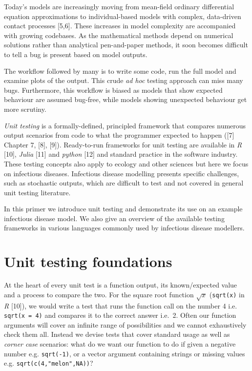\documentclass[10pt,letterpaper]{article}
\begin{document}
Today's models are increasingly moving from mean-field ordinary differential equation approximations to individual-based models with complex, data-driven contact processes {[}5,6{]}.
These increases in model complexity are accompanied with growing codebases.
As the mathematical methods depend on numerical solutions rather than analytical pen-and-paper methods, it soon becomes difficult to tell a bug is present based on model outputs.

The workflow followed by many is to write some code, run the full model and examine plots of the output.
This crude \emph{ad hoc} testing approach can miss many bugs.
Furthermore, this workflow is biased as models that show expected behaviour are assumed bug-free, while models showing unexpected behaviour get more scrutiny.

\emph{Unit testing} is a formally-defined, principled framework that compares numerous output scenarios from code to what the programmer expected to happen ({[}7{]} Chapter 7, {[}8{]}, {[}9{]}).
Ready-to-run frameworks for unit testing are available in \emph{R} {[}10{]}, \emph{Julia} {[}11{]} and \emph{python} {[}12{]} and standard practice in the software industry.
These testing concepts also apply to ecology and other sciences but here we focus on infectious diseases.
Infectious disease modelling presents specific challenges, such as stochastic outputs, which are difficult to test and not covered in general unit testing literature.

In this primer we introduce unit testing and demonstrate its use on an example infectious disease model.
We also give an overview of the available testing frameworks in various languages commonly used by infectious disease modellers.

\hypertarget{unit-testing-foundations}{%
\section{Unit testing foundations}\label{unit-testing-foundations}}

At the heart of every unit test is a function output, its known/expected value and a process to compare the two.
For the square root function \(\sqrt{x}\) (\texttt{sqrt(x)} in \emph{R} {[}10{]}), we would write a test that runs the function call on the number 4 i.e. \texttt{sqrt(x\ =\ 4)} and compares it to the correct answer i.e.~2.
Often our function arguments will cover an infinite range of possibilities and we cannot exhaustively check them all.
Instead we devise tests that cover standard usage as well as \emph{corner case} scenarios: what do we want our function to do if given a negative number e.g. \texttt{sqrt(-1)}, or a vector argument containing strings or missing values e.g. \texttt{sqrt(c(4,"melon",NA))}?
\end{document}
